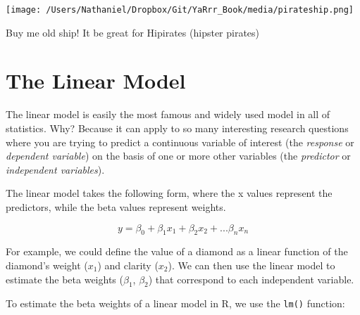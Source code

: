 \documentclass{tufte-book}\usepackage[]{graphicx}\usepackage[]{color}
\begin{document}
\begin{marginfigure}
\texttt{[image: /Users/Nathaniel/Dropbox/Git/YaRrr\_Book/media/pirateship.png]}
\caption{Buy me old ship! It be great for Hipirates (hipster pirates)}
\end{marginfigure}


\section{The Linear Model}

The linear model is easily the most famous and widely used model in all of statistics. Why? Because it can apply to so many interesting research questions where you are trying to predict a continuous variable of interest (the \textit{response} or \textit{dependent variable}) on the basis of one or more other variables (the \textit{predictor} or \textit{independent variables}).

The linear model takes the following form, where the x values represent the predictors, while the beta values represent weights.

\begin{Large}
\begin{equation*}
y=\beta_{0}+\beta_{1}x_{1}+\beta_{2}x_{2}+...\beta_{n}x_{n}
\end{equation*}
\end{Large}

For example, we could define the value of a diamond as a linear function of the diamond's weight ($x_1$) and clarity ($x_2$). We can then use the linear model to estimate the beta weights ($\beta_{1}$, $\beta_{2}$) that correspond to each independent variable.

To estimate the beta weights of a linear model in R, we use the \texttt{lm()} function:
\end{document}
